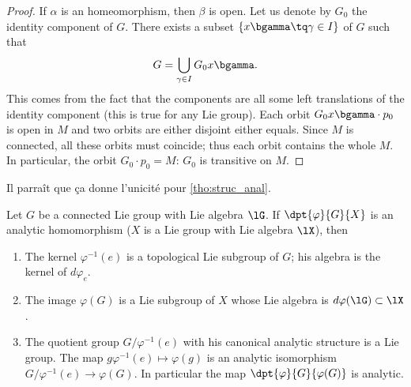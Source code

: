 \begin{proof}
If $\alpha$ is an homeomorphism, then $\beta$ is open. Let us denote by $G_0$ the identity component of $G$. There exists a subset $\{x\bgamma\tq\gamma\in I\}$ of $G$ such that
\[
    G=\bigcup_{\gamma\in I}G_0x\bgamma.
\]
This comes from the fact that the components are all some left translations of the identity component (this is true for any Lie group). Each orbit $G_0x\bgamma\cdot p_0$ is open in $M$ and two orbits are either disjoint either equals. Since $M$ is connected, all these orbits must coincide; thus each orbit contains the whole $M$. In particular, the orbit $G_0\cdot p_0=M$: $G_0$ is transitive on $M$.

\end{proof}

\begin{probleme}
Il parra\^it que \c ca donne l'unicit\'e pour \ref{tho:struc_anal}.
\end{probleme}


\begin{lemma}
Let $G$ be a connected Lie group with Lie algebra $\lG$. If $\dpt{\varphi}{G}{X}$ is an analytic homomorphism ($X$ is a Lie group with Lie algebra $\lX$), then

\begin{enumerate}
\item The kernel $\varphi^{-1}(e)$ is a topological Lie subgroup of $G$; his algebra is the kernel of $d\varphi_e$.
\item The image $\varphi(G)$ is a Lie subgroup of $X$ whose Lie algebra is $d\varphi(\lG)\subset\lX$.
\item The quotient group $G/\varphi^{-1}(e)$ with his canonical analytic structure is a Lie group. The map $g\varphi^{-1}(e)\mapsto\varphi(g)$ is an analytic isomorphism $G/\varphi^{-1}(e)\to\varphi(G)$. In particular the map $\dpt{\varphi}{G}{\varphi(G)}$ is analytic.
\end{enumerate}
\label{lem:vp_G_X}
\end{lemma}

